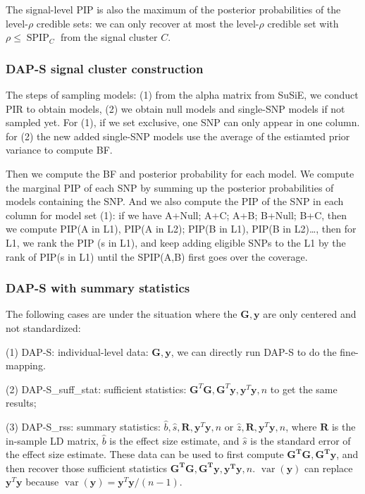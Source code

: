 \documentclass[pdflatex,sn-mathphys-num]{sn-jnl}%
\theoremstyle{thmstyleone}%
\theoremstyle{thmstyletwo}%
\theoremstyle{thmstylethree}%
\begin{document}
The signal-level PIP is also the maximum of the posterior probabilities of the level-$\rho$ credible sets: we can only recover at most the level-$\rho$ credible set with $\rho \leq \operatorname{SPIP}_{C}$ from the signal cluster $C$.


\subsubsection{DAP-S signal cluster construction}
The steps of sampling models: (1) from the alpha matrix from SuSiE, we conduct PIR to obtain models, (2) we obtain null models and single-SNP models if not sampled yet. For (1), if we set exclusive, one SNP can only appear in one column. for (2) the new added single-SNP models use the average of the estiamted prior variance to compute BF.

Then we compute the BF and posterior probability for each model. We compute the marginal PIP of each SNP by summing up the posterior probabilities of models containing the SNP. And we also compute the PIP of the SNP in each column for model set (1): if we have A+Null; A+C; A+B; B+Null; B+C, then we compute PIP(A in L1), PIP(A in L2); PIP(B in L1), PIP(B in L2)\dots, then for L1, we rank the PIP (s in L1), and keep adding eligible SNPs to the L1 by the rank of PIP(s in L1) until the SPIP(A,B) first goes over the coverage.

\subsubsection{DAP-S with summary statistics}
The following cases are under the situation where the $\mathbf{G}, \mathbf{y}$ are only centered and not standardized:

(1) DAP-S: individual-level data: $\mathbf{G}, \mathbf{y}$, we can directly run DAP-S to do the fine-mapping.

(2) DAP-S\_suff\_stat: sufficient statistics: $\mathbf{G}^T\mathbf{G}, \mathbf{G}^T\mathbf{y}, \mathbf{y}^T\mathbf{y}, n$ to get the same results;

(3) DAP-S\_rss: summary statistics: $\hat{b}, \hat{s}, \mathbf{R}, \mathbf{y}^T\mathbf{y}, n$ or $\hat{z}, \mathbf{R}, \mathbf{y}^T\mathbf{y}, n$, where $\mathbf{R}$ is the in-sample LD matrix, $\hat{b}$ is the effect size estimate, and $\hat{s}$ is the standard error of the effect size estimate. These data can be used to first compute $\mathbf{G^TG}, \mathbf{G^Ty}$, and then recover those sufficient statistics $\mathbf{G^TG}, \mathbf{G^Ty}, \mathbf{y^Ty}, n$. $\operatorname{var}(\mathbf{y})$ can replace $\mathbf{y}^T\mathbf{y}$ because $\operatorname{var}(\mathbf{y}) = \mathbf{y}^T\mathbf{y}/(n-1)$.
\end{document}
